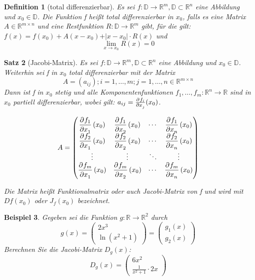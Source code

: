 \documentclass[fontset=ubuntu,12pt,a4paper]{scrreprt}
\newtheorem{defi}{Definition}[section]
\newtheorem{beispiel}[defi]{Beispiel}
\newtheorem{satz}[defi]{Satz}
\begin{document}
\begin{defi}[total differenzierbar]
    Es sei \(f:\mathbb{D}\to \mathbb{R}^m,\mathbb{D}\subset\mathbb{R}^n\) eine Abbildung und \(x_0\in\mathbb{D}\). Die Funktion f heißt total differenzierbar in \(x_0\), falls es eine Matrix \(A\in\mathbb{R}^{m\times n}\) und eine Restfunktion \(R:\mathbb{D}\to\mathbb{R}^m\) gibt, für die gilt: \(f(x)=f(x_0)+A(x-x_0)+\vert x-x_0 \vert\cdot R(x)\) und \[\lim_{x\to x_0} R(x)=0\]
\end{defi}

\begin{satz}[Jacobi-Matrix]
    Es sei \(f:\mathbb{D}\to \mathbb{R}^m,\mathbb{D}\subset\mathbb{R}^n\) eine Abbildung und \(x_0\in\mathbb{D}\). Weiterhin sei f in \(x_0\) total differenzierbar mit der Matrix
    \[A=(a_{ij});i=1,\dots,m;j=1,\dots,n \in\mathbb{R}^{m\times n}\]
    Dann ist f in \(x_0\) stetig und alle Komponentenfunktionen \(f_1,\dots,f_m:\mathbb{R}^n\to\mathbb{R}\) sind in \(x_0\) partiell differenzierbar, wobei gilt: \(a_{ij}=\pd{f_i}{x_j}(x_0)\).
    
    \[A=\begin{pmatrix}
    \dpd{f_1}{x_1}(x_0) & \dpd{f_1}{x_2}(x_0) & \cdots & \dpd{f_1}{x_n}(x_0) \\
    \dpd{f_2}{x_1}(x_0) & \dpd{f_2}{x_2}(x_0) & \cdots & \dpd{f_2}{x_n}(x_0) \\
    \vdots & \vdots & \ddots & \vdots \\
    \dpd{f_m}{x_1}(x_0) & \dpd{f_m}{x_2}(x_0) & \cdots & \dpd{f_m}{x_n}(x_0)
    \end{pmatrix}\]
    
    Die Matrix heißt Funktionalmatrix oder auch Jacobi-Matrix von f und wird mit \(Df(x_0)\) oder \(J_f(x_0)\) bezeichnet.
\end{satz}

\begin{beispiel}
    Gegeben sei die Funktion \(g:\mathbb{R}\to\mathbb{R}^2\) durch \[g(x)=\begin{pmatrix}2x^3 \\ \ln(x^2+1)
    \end{pmatrix} = \begin{pmatrix}
    g_1(x) \\ g_2(x)
    \end{pmatrix}\]
    Berechnen Sie die Jacobi-Matrix \(D_g(x)\):
    \[D_g(x)=\begin{pmatrix}6x^2 \\ \frac{1}{x^2+1}\cdot2x\end{pmatrix}\]
\end{beispiel}
\end{document}
